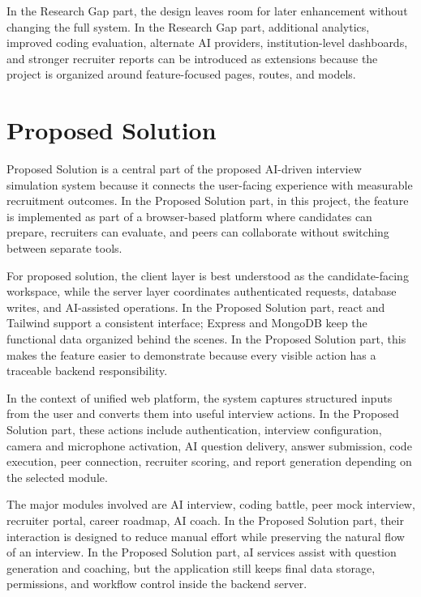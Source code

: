 \documentclass[12pt,a4paper]{report}
\begin{document}
In the Research Gap part, the design leaves room for later enhancement without changing the full system. In the Research Gap part, additional analytics, improved coding evaluation, alternate AI providers, institution-level dashboards, and stronger recruiter reports can be introduced as extensions because the project is organized around feature-focused pages, routes, and models.


\section{Proposed Solution}

Proposed Solution is a central part of the proposed AI-driven interview simulation system because it connects the user-facing experience with measurable recruitment outcomes. In the Proposed Solution part, in this project, the feature is implemented as part of a browser-based platform where candidates can prepare, recruiters can evaluate, and peers can collaborate without switching between separate tools.


For proposed solution, the client layer is best understood as the candidate-facing workspace, while the server layer coordinates authenticated requests, database writes, and AI-assisted operations. In the Proposed Solution part, react and Tailwind support a consistent interface; Express and MongoDB keep the functional data organized behind the scenes. In the Proposed Solution part, this makes the feature easier to demonstrate because every visible action has a traceable backend responsibility.


In the context of unified web platform, the system captures structured inputs from the user and converts them into useful interview actions. In the Proposed Solution part, these actions include authentication, interview configuration, camera and microphone activation, AI question delivery, answer submission, code execution, peer connection, recruiter scoring, and report generation depending on the selected module.


The major modules involved are AI interview, coding battle, peer mock interview, recruiter portal, career roadmap, AI coach. In the Proposed Solution part, their interaction is designed to reduce manual effort while preserving the natural flow of an interview. In the Proposed Solution part, aI services assist with question generation and coaching, but the application still keeps final data storage, permissions, and workflow control inside the backend server.
\end{document}
